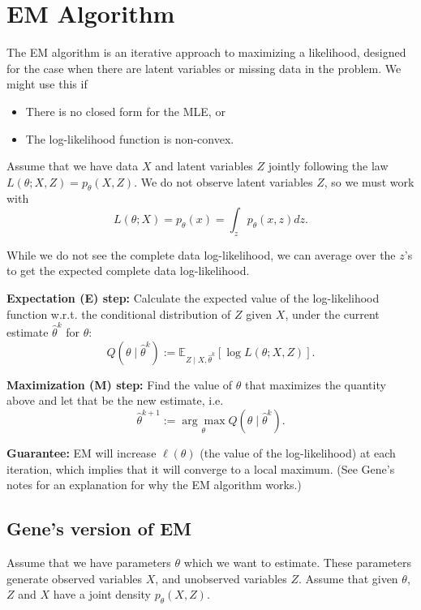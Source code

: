 \documentclass[twoside]{article}
\newcommand\bbE{\mathbb{E}}
\def\t{\theta}
\begin{document}
\section{EM Algorithm}
The EM algorithm is an iterative approach to maximizing a likelihood, designed for the case when there are latent variables or missing data in the problem. We might use this if
\begin{itemize}
\item There is no closed form for the MLE, or
\item The log-likelihood function is non-convex.
\end{itemize}

Assume that we have data $X$ and latent variables $Z$ jointly following the law $L(\t; X, Z) = p_\t(X,Z)$. We do not observe latent variables $Z$, so we must work with
\begin{equation*}
L(\t; X) = p_\t(x) = \int_z p_\t (x, z) dz.
\end{equation*}

While we do not see the complete data log-likelihood, we can average over the $z$'s to get the expected complete data log-likelihood.

\textbf{Expectation (E) step:} Calculate the expected value of the log-likelihood function w.r.t. the conditional distribution of $Z$ given $X$, under the current estimate $\hat{\t}^k$ for $\t$:
\begin{equation*}
Q \left( \t \mid \hat{\t}^k \right) := \bbE_{Z \mid X, \hat{\t}^k} \left[ \log L(\t; X, Z) \right].
\end{equation*}

\textbf{Maximization (M) step:} Find the value of $\t$ that maximizes the quantity above and let that be the new estimate, i.e.
\begin{equation*}
\hat{\t}^{k+1} := \underset{\t}{\arg\max } Q \left( \t \mid \hat{\t}^k \right).
\end{equation*}

\textbf{Guarantee:} EM will increase $\ell(\t)$ (the value of the log-likelihood) at each iteration, which implies that it will converge to a local maximum. (See Gene's notes for an explanation for why the EM algorithm works.)

\subsection*{Gene's version of EM}

Assume that we have parameters $\t$ which we want to estimate. These parameters generate observed variables $X$, and unobserved variables $Z$. Assume that given $\t$, $Z$ and $X$ have a joint density $p_\t(X, Z)$.
\end{document}
